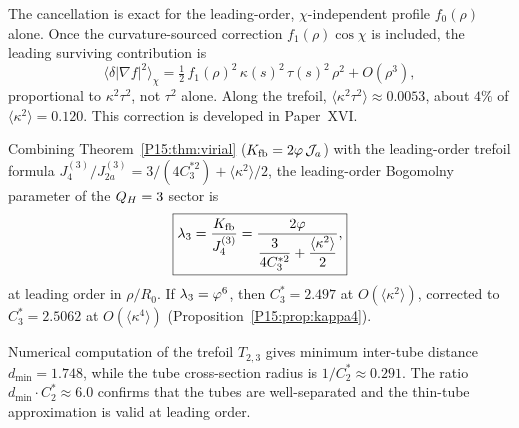 \begin{remark}
\label{P15:rem:torsion_scope}
The cancellation is exact for the leading-order, $\chi$-independent
profile $f_0(\rho)$ alone. Once the curvature-sourced correction
$f_1(\rho)\cos\chi$ is included, the leading surviving contribution
is
\begin{equation}
  \bigl\langle\delta|\nabla f|^2\bigr\rangle_\chi
  = \tfrac{1}{2}\,f_1(\rho)^2\,\kappa(s)^2\,\tau(s)^2\,\rho^2
  + O(\rho^3),
  \label{P15:eq:torsion_correction}
\end{equation}
proportional to $\kappa^2\tau^2$, not $\tau^2$ alone.
Along the trefoil, $\langle\kappa^2\tau^2\rangle\approx0.0053$,
about $4\%$ of $\langle\kappa^2\rangle=0.120$.
This correction is developed in Paper~XVI.
\end{remark}

\begin{corollary}
\label{P15:cor:lambda3}
Combining Theorem~\ref{P15:thm:virial} ($K_{\mathrm{fb}}=2\varphi\,\mathcal{J}_a$)
with the leading-order trefoil formula
$J_4^{(3)}/J_{2a}^{(3)}=3/(4C_3^{*2})+\langle\kappa^2\rangle/2$,
the leading-order Bogomolny parameter of the $Q_H=3$ sector is
\begin{equation}
  \boxed{\lambda_3
  = \frac{K_{\mathrm{fb}}}{J_4^{(3)}}
  = \frac{2\varphi}{\dfrac{3}{4C_3^{*2}}+\dfrac{\langle\kappa^2\rangle}{2}},}
  \label{P15:eq:lambda3}
\end{equation}
at leading order in $\rho/R_0$.
If $\lambda_3=\varphi^6$, then $C_3^*=2.497$ at $O(\langle\kappa^2\rangle)$,
corrected to $C_3^*=2.5062$ at $O(\langle\kappa^4\rangle)$
(Proposition~\ref{P15:prop:kappa4}).
\end{corollary}

\begin{remark}
\label{P15:rem:tube_separation}
Numerical computation of the trefoil $T_{2,3}$ gives minimum
inter-tube distance $d_{\min}=1.748$, while the tube
cross-section radius is $1/C^*_2\approx0.291$.
The ratio $d_{\min}\cdot C^*_2\approx 6.0$ confirms that the
tubes are well-separated and the thin-tube approximation is valid
at leading order.
\end{remark}

